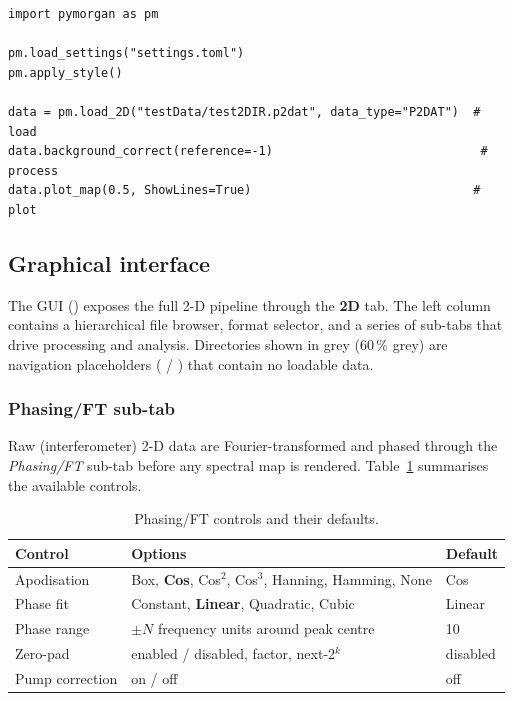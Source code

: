 \begin{lstlisting}
import pymorgan as pm

pm.load_settings("settings.toml")
pm.apply_style()

data = pm.load_2D("testData/test2DIR.p2dat", data_type="P2DAT")  # load
data.background_correct(reference=-1)                             # process
data.plot_map(0.5, ShowLines=True)                               # plot
\end{lstlisting}

\subsection{Graphical interface}\label{sec:twoD:gui}

The GUI () exposes the full 2-D pipeline through the
\textbf{2D} tab.  The left column contains a hierarchical file browser,
format selector, and a series of sub-tabs that drive processing and
analysis.  Directories shown in grey (60\,\% grey) are navigation
placeholders (\code{[..]} / \code{[...]}) that contain no loadable data.

\subsubsection{Phasing/FT sub-tab}

Raw (interferometer) 2-D data are Fourier-transformed and phased through
the \emph{Phasing/FT} sub-tab before any spectral map is rendered.
Table~\ref{tab:phasing} summarises the available controls.

\begin{table}[h]
  \centering
  \begin{tabular}{lll}
    \toprule
    Control & Options & Default \\
    \midrule
    Apodisation & Box, \textbf{Cos}, Cos$^2$, Cos$^3$, Hanning, Hamming, None & Cos \\
    Phase fit   & Constant, \textbf{Linear}, Quadratic, Cubic & Linear \\
    Phase range & $\pm N$ frequency units around peak centre & 10 \\
    Zero-pad    & enabled / disabled, factor, next-2$^k$ & disabled \\
    Pump correction & on / off & off \\
    \bottomrule
  \end{tabular}
  \caption{Phasing/FT controls and their defaults.}
  \label{tab:phasing}
\end{table}

